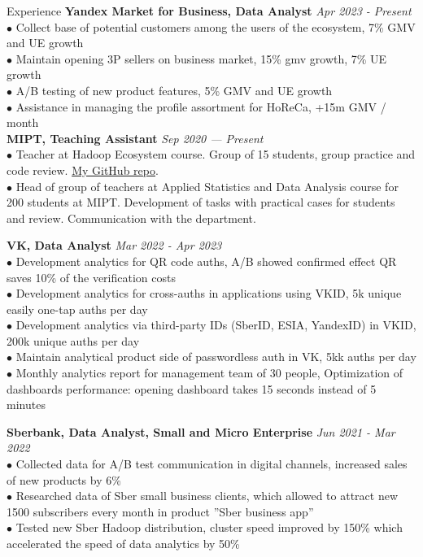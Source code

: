 \documentclass{resume} %
\begin{document}
\begin{rSection}{ Experience }
    { \bf Yandex Market for Business, Data Analyst} \hfill {\em Apr 2023 - Present}\\
    { $\bullet$ Collect base of potential customers among the users of the ecosystem, 7\% GMV and UE growth } \\
    { $\bullet$ Maintain opening 3P sellers on business market, 15\% gmv growth, 7\% UE growth} \\
    { $\bullet$ A/B testing of new product features, 5\% GMV and UE growth} \\ 
    { $\bullet$ Assistance in managing the profile assortment for HoReCa, +15m GMV / month} \\ 

    { \bf MIPT, Teaching Assistant} \hfill {\em Sep 2020 — Present}\\
    { $\bullet$ Teacher at Hadoop Ecosystem course. Group of 15 students, group practice and code review. \href{https://github.com/YHx07/pd-seminars}{My GitHub repo}.}\\
    { $\bullet$ Head of group of teachers at Applied Statistics and Data Analysis course for 200 students at MIPT. Development of tasks with practical cases for students and review. Communication with the department. }

    { \bf VK, Data Analyst} \hfill {\em Mar 2022 - Apr 2023}\\
    { $\bullet$ Development analytics for QR code auths, A/B showed confirmed effect QR saves 10\% of the verification costs} \\
    { $\bullet$ Development analytics for cross-auths in applications using VKID, 5k unique easily one-tap auths per day}\\
    { $\bullet$ Development analytics via third-party IDs (SberID, ESIA, YandexID) in VKID, 200k unique auths per day}\\
    { $\bullet$ Maintain analytical product side of passwordless auth in VK, 5kk auths per day }\\
    {$\bullet$ Monthly analytics report for management team of 30 people, Optimization of dashboards performance: opening dashboard takes 15 seconds instead of 5 minutes}

    { \bf Sberbank, Data Analyst, Small and Micro Enterprise} \hfill {\em Jun 2021 - Mar 2022}\\
    { $\bullet$ Collected data for A/B test communication in digital channels, increased sales of new products by 6\% }\\
    { $\bullet$ Researched data of Sber small business clients, which allowed to attract new 1500 subscribers every month in product ''Sber business app'' }\\
    { $\bullet$ Tested new Sber Hadoop distribution, cluster speed improved by 150\% which accelerated the speed of data analytics by 50\%}
    

\end{rSection}
\end{document}
